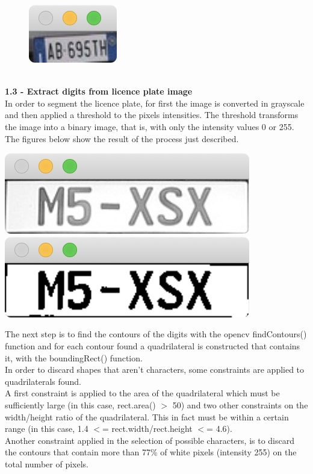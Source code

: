 \documentclass[11pt]{article}
\begin{document}
\begin{titlepage}
{\begin{figure}[htbp]
\includegraphics[totalheight=0.13\textwidth]{t2.jpg}
\end{figure}\\
\textbf{\large{1.3 - Extract digits from licence plate image}}\\
[1 mm]
In order to segment the licence plate, for first the image is converted in grayscale and then applied a threshold to the pixels intensities. The threshold transforms the image into a binary image, that is, with only the intensity values 0 or 255.
The figures below show the result of the process just described.
\begin{center}
\centering
\includegraphics[totalheight=0.13\textwidth]{m.jpg}
\includegraphics[totalheight=0.13\textwidth]{o.jpg}
\end{center}
The next step is to find the contours of the digits with the opencv findContours() function and for each contour found a quadrilateral is constructed that contains it, with the boundingRect() function.
\\ In order to discard shapes that aren't characters, some constraints are applied to quadrilaterals found.
\\A first constraint is applied to the area of the quadrilateral which must be sufficiently large (in this case, rect.area() $>$ 50) and two other constraints on the width/height ratio of the quadrilateral. This in fact must be within a certain range (in this case, 1.4 $<$= rect.width/rect.height $<$= 4.6).
\\ Another constraint applied in the selection of possible characters, is to discard the contours that contain more than 77\% of white pixels (intensity 255) on the total number of pixels.
}
\end{titlepage}
\end{document}
